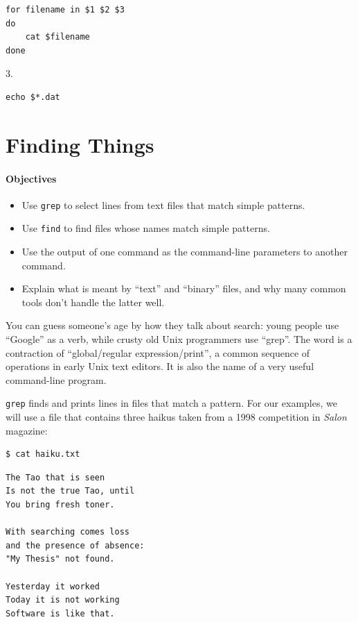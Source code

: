 \documentclass[]{book}
\begin{document}
\begin{verbatim}
for filename in $1 $2 $3
do
    cat $filename
done
\end{verbatim}

3.

\begin{verbatim}
echo $*.dat
\end{verbatim}

\section{Finding Things}

\mbox{}\paragraph{Objectives}

\begin{itemize}
\item
  Use \texttt{grep} to select lines from text files that match simple
  patterns.
\item
  Use \texttt{find} to find files whose names match simple patterns.
\item
  Use the output of one command as the command-line parameters to
  another command.
\item
  Explain what is meant by ``text'' and ``binary'' files, and why many
  common tools don't handle the latter well.
\end{itemize}

You can guess someone's age by how they talk about search: young people
use ``Google'' as a verb, while crusty old Unix programmers use
``grep''. The word is a contraction of ``global/regular
expression/print'', a common sequence of operations in early Unix text
editors. It is also the name of a very useful command-line program.

\texttt{grep} finds and prints lines in files that match a pattern. For
our examples, we will use a file that contains three haikus taken from a
1998 competition in \emph{Salon} magazine:

\begin{verbatim}
$ cat haiku.txt
\end{verbatim}

\begin{verbatim}
The Tao that is seen
Is not the true Tao, until
You bring fresh toner.

With searching comes loss
and the presence of absence:
"My Thesis" not found.

Yesterday it worked
Today it is not working
Software is like that.
\end{verbatim}
\end{document}

